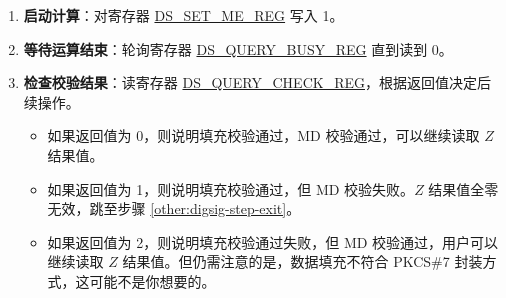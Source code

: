 \documentclass[main\_\_CN.tex]{subfiles}
\begin{document}
\begin{enumerate}
\begin{itemize}
        \item 将 \begin{math}\widehat{Box}_{i}\end{math}
        (\begin{math}i \in \{ 0, 1, \dots, 11 \} \end{math})
        写入存储器 \hyperref[DSBOXMEM]{DS\_BOX\_MEM}。
        
        其中 存储器 
        \hyperref[DSYMEM]{DS\_Y\_MEM}、
        \hyperref[DSMMEM]{DS\_M\_MEM}、
        \hyperref[DSRBMEM]{DS\_RB\_MEM} 的
        容量均为 96 个字，
        而存储器 \hyperref[DSBOXMEM]{DS\_BOX\_MEM} 容量只有 12 个字。
        每一个字刚好存放一个 \begin{math}b\end{math} 进制数。
        存储器的低地址存放运算子的低位进制数，高地址存放运算子的高位进制数。
    
    \end{itemize}

    \item {\bfseries 启动计算}：对寄存器 \hyperref[regdesc:DSSETMEREG]{DS\_SET\_ME\_REG} 写入 1。

    \item {\bfseries 等待运算结束}：轮询寄存器 \hyperref[regdesc:DSQUERYBUSYREG]{DS\_QUERY\_BUSY\_REG} 直到读到 0。

    \item {\bfseries 检查校验结果}：读寄存器 \hyperref[regdesc:DSQUERYCHECKREG]{DS\_QUERY\_CHECK\_REG}，根据返回值决定后续操作。
    
    \begin{itemize}
    
        \item 如果返回值为 0，则说明填充校验通过，MD 校验通过，可以继续读取 \begin{math}Z\end{math} 结果值。
        
        \item 如果返回值为 1，则说明填充校验通过，但 MD 校验失败。\begin{math}Z\end{math} 结果值全零无效，跳至步骤 \ref{other:digsig-step-exit}。
        
        \item 如果返回值为 2，则说明填充校验通过失败，但 MD 校验通过，用户可以继续读取 \begin{math}Z\end{math} 结果值。但仍需注意的是，数据填充不符合 PKCS\#7 封装方式，这可能不是你想要的。
        

\end{itemize}
\end{enumerate}
\end{document}
